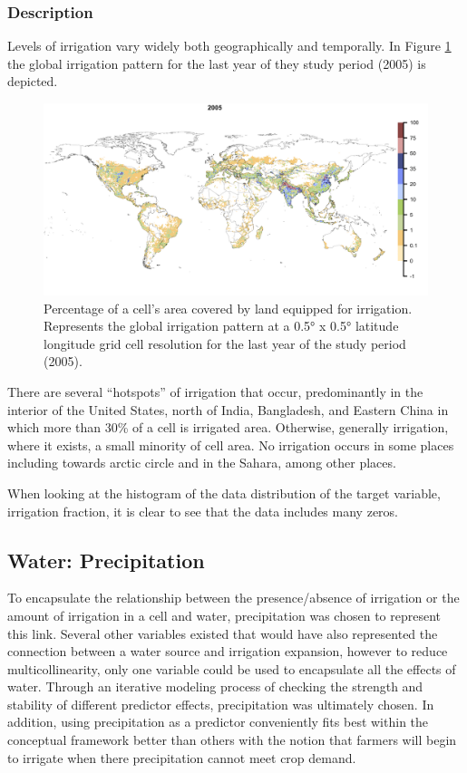\documentclass[12pt,twoside]{reedthesis}
\begin{document}
\hypertarget{irrfracdesc}{%
\subsubsection{Description}\label{irrfracdesc}}

Levels of irrigation vary widely both geographically and temporally. In Figure \ref{fig:irrfrac2005} the global irrigation pattern for the last year of they study period (2005) is depicted.
\begin{figure}
\includegraphics[width=1000px]{figure/irrfrac2005} \caption{Percentage of a cell's area covered by land equipped for irrigation. Represents the global irrigation pattern at a 0.5° x 0.5° latitude longitude grid cell resolution for the last year of the study period (2005).}\label{fig:irrfrac2005}
\end{figure}
There are several ``hotspots'' of irrigation that occur, predominantly in the interior of the United States, north of India, Bangladesh, and Eastern China in which more than 30\% of a cell is irrigated area. Otherwise, generally irrigation, where it exists, a small minority of cell area. No irrigation occurs in some places including towards arctic circle and in the Sahara, among other places.

When looking at the histogram of the data distribution of the target variable, irrigation fraction, it is clear to see that the data includes many zeros.

\hypertarget{precip}{%
\subsection{Water: Precipitation}\label{precip}}

To encapsulate the relationship between the presence/absence of irrigation or the amount of irrigation in a cell and water, precipitation was chosen to represent this link. Several other variables existed that would have also represented the connection between a water source and irrigation expansion, however to reduce multicollinearity, only one variable could be used to encapsulate all the effects of water. Through an iterative modeling process of checking the strength and stability of different predictor effects, precipitation was ultimately chosen. In addition, using precipitation as a predictor conveniently fits best within the conceptual framework better than others with the notion that farmers will begin to irrigate when there precipitation cannot meet crop demand.
\end{document}
